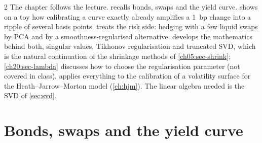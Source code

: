 \begin{paracol}{2}
The chapter follows the lecture.  recalls bonds, swaps and the yield curve. 
shows on a toy how calibrating a curve exactly already amplifies a 1~bp change into a ripple of several
basis points.  treats the risk side: hedging with a few liquid swaps by PCA and by a smoothness-regularised
alternative.  develops the mathematics behind both, singular values, Tikhonov regularisation and
truncated SVD, which is the natural continuation of the shrinkage methods of \cref{ch05:sec-shrink}; \cref{ch20:sec-lambda}
discusses how to choose the regularisation parameter (not covered in class).  applies everything
to the calibration of a volatility surface for the Heath--Jarrow--Morton model (\cref{ch:hjm}). The linear algebra needed is
the SVD of \cref{sec:svd}.

\section{Bonds, swaps and the yield curve}\label{ch20:sec-bonds}


\end{paracol}
